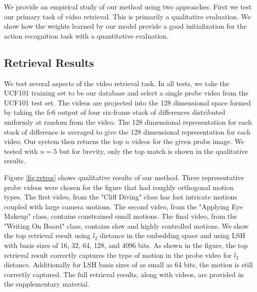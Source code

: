 We provide an empirical study of our method using two approaches. First we test our primary task of video retrieval. This is primarily a qualitative evaluation. We show how the weights learned by our model provide a good initialization for the action recognition task with a quantitative evaluation.

\subsection{Retrieval Results}

We test several aspects of the video retrieval task. In all tests, we take the UCF101 \cite{soomro2012ucf101} training set to be our database and select a single probe video from the UCF101 test set. The videos are projected into the 128 dimensional space formed by taking the fc6 output of four six-frame stack of differences distributed uniformly at random from the video. The 128 dimensional representation for each stack of difference is averaged to give the 128 dimensional representation for each video. Our system then returns the top $n$ videos for the given probe image. We tested with $n=5$ but for brevity, only the top match is shown in the qualitative results.

Figure \ref{fig:retres} shows qualitative results of our method. Three representative probe videos were chosen for the figure that had roughly orthogonal motion types. The first video, from the "Cliff Diving" class has fast intricate motions coupled with large camera motions. The second video, from the "Applying Eye Makeup" class, contains constrained small motions. The final video, from the "Writing On Board" class, contains slow and highly controlled motions. We show the top retrieval result using $l_2$ distance in the embedding space and using LSH with basis sizes of 16, 32, 64, 128, and 4096 bits. As shown in the figure, the top retrieval result correctly captures the type of motion in the probe video for $l_2$ distance. Additionally for LSH basis sizes of as small as 64 bits, the motion is still correctly captured. The full retrieval results, along with videos, are provided in the supplementary material.

